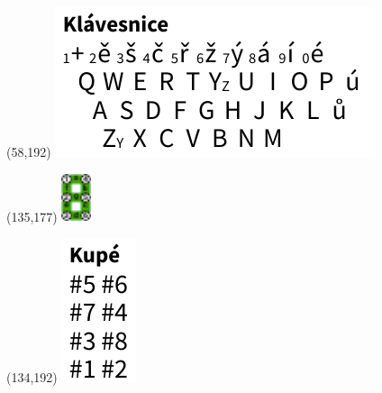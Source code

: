 \documentclass{extarticle}
\begin{document}
\begin{textblock}{0}(58,192)%
\vfill
{\includegraphics[scale=0.7]{tools/keyboard.pdf}}
\vfill
\end{textblock}

\begin{textblock}{0}(135,177)%
\vfill
{\includegraphics[height=1.4cm]{tools/images/segment-numbering.pdf}}
\vfill
\end{textblock}

\begin{textblock}{0}(134,192)%
\vfill
{\includegraphics[scale=0.7]{tools/train.pdf}}
\vfill
\end{textblock}
\end{document}

